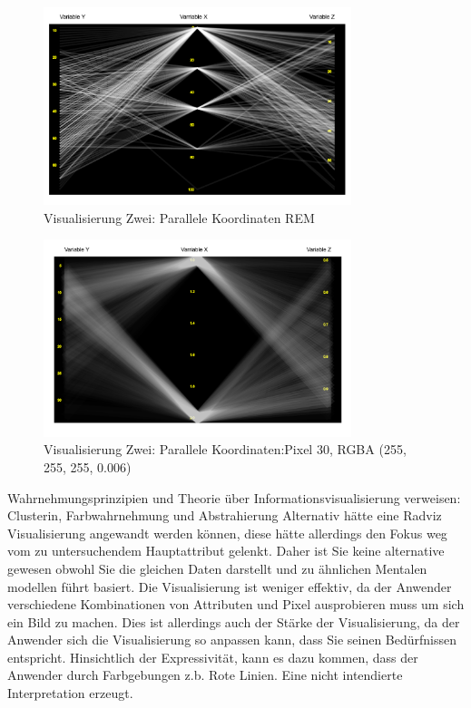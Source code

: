 \documentclass[usegeometry=true]{scrartcl}
\begin{document}
\begin{figure}[h]
  \centering
  \includegraphics [width = 0.8\textwidth]{RoengtenBSP.JPG}
  \caption{Visualisierung Zwei:  Parallele Koordinaten REM  }
\end{figure}



 
\begin{figure}[h]
  \centering
  \includegraphics [width = 0.8\textwidth]{ParalleleBSPPixel.JPG}
  \caption{Visualisierung Zwei: Parallele Koordinaten:Pixel 30, RGBA (255, 255, 255, 0.006) }
\end{figure}
Wahrnehmungsprinzipien und Theorie über Informationsvisualisierung verweisen:
Clusterin, Farbwahrnehmung  und Abstrahierung
Alternativ hätte eine Radviz Visualisierung angewandt werden können, diese hätte allerdings den Fokus weg vom zu untersuchendem Hauptattribut gelenkt. Daher ist Sie keine alternative gewesen obwohl Sie die gleichen Daten darstellt und zu ähnlichen Mentalen modellen führt basiert.
Die Visualisierung ist weniger effektiv, da der Anwender verschiedene Kombinationen von Attributen und Pixel ausprobieren muss um sich ein Bild zu machen. Dies ist allerdings auch der Stärke der Visualisierung, da der Anwender sich die Visualisierung so anpassen kann, dass Sie seinen Bedürfnissen entspricht. Hinsichtlich der Expressivität, kann es dazu kommen, dass der Anwender durch Farbgebungen z.b. Rote Linien. Eine nicht intendierte Interpretation erzeugt.
\end{document}
